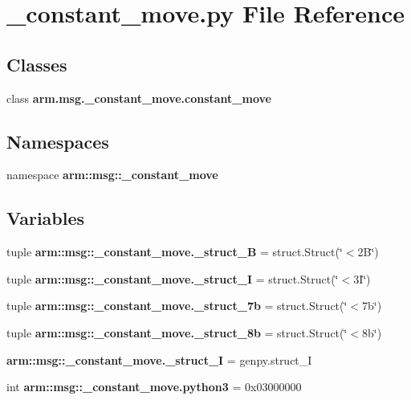 \section{\-\_\-constant\-\_\-move.\-py \-File \-Reference}
\label{__constant__move_8py}
\subsection*{\-Classes}
\begin{DoxyCompactItemize}
\item 
class {\bf arm.\-msg.\-\_\-constant\-\_\-move.\-constant\-\_\-move}
\end{DoxyCompactItemize}
\subsection*{\-Namespaces}
\begin{DoxyCompactItemize}
\item 
namespace {\bf arm\-::msg\-::\-\_\-constant\-\_\-move}
\end{DoxyCompactItemize}
\subsection*{\-Variables}
\begin{DoxyCompactItemize}
\item 
tuple {\bf arm\-::msg\-::\-\_\-constant\-\_\-move.\-\_\-struct\-\_\-B} = struct.\-Struct(\char`\"{}$<$2\-B\char`\"{})
\item 
tuple {\bf arm\-::msg\-::\-\_\-constant\-\_\-move.\-\_\-struct\-\_\-I} = struct.\-Struct(\char`\"{}$<$3\-I\char`\"{})
\item 
tuple {\bf arm\-::msg\-::\-\_\-constant\-\_\-move.\-\_\-struct\-\_\-7b} = struct.\-Struct(\char`\"{}$<$7b\char`\"{})
\item 
tuple {\bf arm\-::msg\-::\-\_\-constant\-\_\-move.\-\_\-struct\-\_\-8b} = struct.\-Struct(\char`\"{}$<$8b\char`\"{})
\item 
{\bf arm\-::msg\-::\-\_\-constant\-\_\-move.\-\_\-struct\-\_\-\-I} = genpy.\-struct\-\_\-\-I
\item 
int {\bf arm\-::msg\-::\-\_\-constant\-\_\-move.\-python3} = 0x03000000
\end{DoxyCompactItemize}
